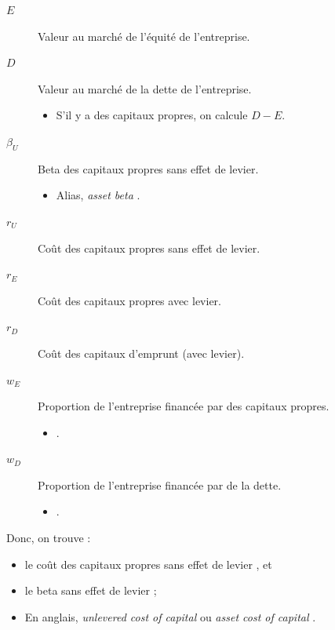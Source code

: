 \documentclass[10pt, french]{article}
\begin{document}
\begin{multicols*}{2}
\begin{definitionNOHFILLsub}
\begin{distributions}[Notation]
\begin{description}
	\item[$E$]	Valeur au marché de l'équité de l'entreprise.
	\item[$D$]	Valeur au marché de la dette de l'entreprise.
		\begin{itemize}
		\item	S'il y a des capitaux propres, on calcule $D - E$.
		\end{itemize}
	\item[$\beta_{U}$]	Beta des capitaux propres sans effet de levier.
		\begin{itemize}
		\item	Alias, \og \textit{asset beta} \fg{}.
		\end{itemize}
	\item[$r_{U}$]	Coût des capitaux propres sans effet de levier.
	\item[$r_{E}$]	Coût des capitaux propres avec levier.
	\item[$r_{D}$]	Coût des capitaux d'emprunt (avec levier).
	\item[$w_{E}$]	Proportion de l'entreprise financée par des capitaux propres.
		\begin{itemize}
		\item	{}.
		\end{itemize}
	\item[$w_{D}$]	Proportion de l'entreprise financée par de la dette.
		\begin{itemize}
		\item	{}.
		\end{itemize}
\end{description}
\end{distributions}

Donc, on trouve : 
\begin{itemize}
	\item	le coût des capitaux propres sans effet de levier , et 
	\item	le beta sans effet de levier  ;
	\item	En anglais, \og \textit{unlevered cost of capital} \fg{} ou \og \textit{asset cost of capital} \fg{}.
\end{itemize}
\end{definitionNOHFILLsub}


\end{multicols*}
\end{document}
